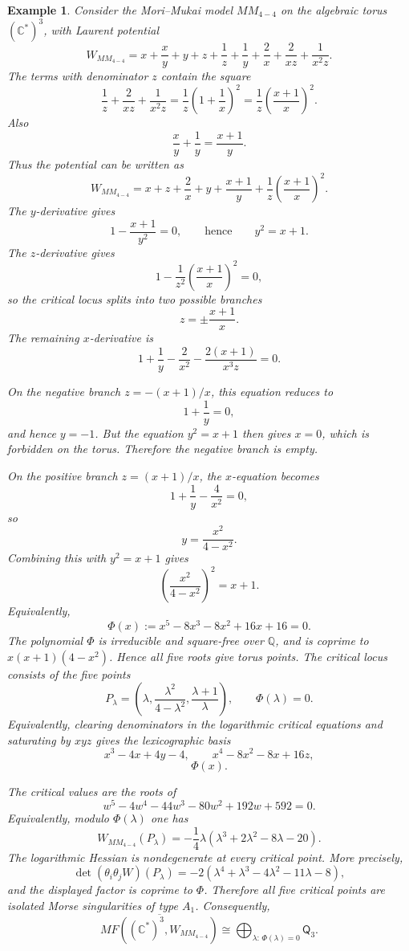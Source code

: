 \documentclass[11pt]{amsart}
\newtheorem{example}{Example}[section]
\newcommand{\MorseCat}[1]{\mathsf{Q}_{#1}}
\begin{document}
\begin{example}
Consider the Mori--Mukai model $MM_{4-4}$ on the algebraic torus
$(\mathbb{C}^*)^3$, with Laurent potential
\[
W_{MM_{4-4}}=x+\frac{x}{y}+y+z+\frac{1}{z}+\frac{1}{y}
+\frac{2}{x}+\frac{2}{xz}+\frac{1}{x^2z}.
\]
The terms with denominator $z$ contain the square
\[
\frac{1}{z}+\frac{2}{xz}+\frac{1}{x^2z}
=\frac{1}{z}\left(1+\frac{1}{x}\right)^2
=\frac{1}{z}\left(\frac{x+1}{x}\right)^2.
\]
Also
\[
\frac{x}{y}+\frac{1}{y}=\frac{x+1}{y}.
\]
Thus the potential can be written as
\[
W_{MM_{4-4}}=x+z+\frac{2}{x}+y+\frac{x+1}{y}
+\frac{1}{z}\left(\frac{x+1}{x}\right)^2.
\]
The $y$-derivative gives
\[
1-\frac{x+1}{y^2}=0,
\qquad\text{hence}\qquad
y^2=x+1.
\]
The $z$-derivative gives
\[
1-\frac{1}{z^2}\left(\frac{x+1}{x}\right)^2=0,
\]
so the critical locus splits into two possible branches
\[
z=\pm\frac{x+1}{x}.
\]
The remaining $x$-derivative is
\[
1+\frac{1}{y}-\frac{2}{x^2}
-\frac{2(x+1)}{x^3z}=0.
\]

On the negative branch $z=-(x+1)/x$, this equation reduces to
\[
1+\frac{1}{y}=0,
\]
and hence $y=-1$. But the equation $y^2=x+1$ then gives $x=0$, which is
forbidden on the torus. Therefore the negative branch is empty.

On the positive branch $z=(x+1)/x$, the $x$-equation becomes
\[
1+\frac{1}{y}-\frac{4}{x^2}=0,
\]
so
\[
y=\frac{x^2}{4-x^2}.
\]
Combining this with $y^2=x+1$ gives
\[
\left(\frac{x^2}{4-x^2}\right)^2=x+1.
\]
Equivalently,
\[
\Phi(x):=x^5-8x^3-8x^2+16x+16=0.
\]
The polynomial $\Phi$ is irreducible and square-free over $\mathbb{Q}$, and is
coprime to $x(x+1)(4-x^2)$. Hence all five roots give torus points. The
critical locus consists of the five points
\[
P_\lambda=\left(
\lambda,
\frac{\lambda^2}{4-\lambda^2},
\frac{\lambda+1}{\lambda}
\right),
\qquad
\Phi(\lambda)=0.
\]
Equivalently, clearing denominators in the logarithmic critical equations and
saturating by $xyz$ gives the lexicographic basis
\[
x^3-4x+4y-4,
\qquad
x^4-8x^2-8x+16z,
\]
\[
\Phi(x).
\]

The critical values are the roots of
\[
w^5-4w^4-44w^3-80w^2+192w+592=0.
\]
Equivalently, modulo $\Phi(\lambda)$ one has
\[
W_{MM_{4-4}}(P_\lambda)=
-\frac{1}{4}\lambda(\lambda^3+2\lambda^2-8\lambda-20).
\]
The logarithmic Hessian is nondegenerate at every critical point. More
precisely,
\[
\det(\theta_i\theta_jW)(P_\lambda)
=-2(\lambda^4+\lambda^3-4\lambda^2-11\lambda-8),
\]
and the displayed factor is coprime to $\Phi$. Therefore all five critical
points are isolated Morse singularities of type $A_1$. Consequently,
\[
\overline{MF((\mathbb{C}^*)^3,W_{MM_{4-4}})}
\cong \bigoplus_{\lambda:\,\Phi(\lambda)=0}\MorseCat{3}.
\]
\end{example}
\end{document}
